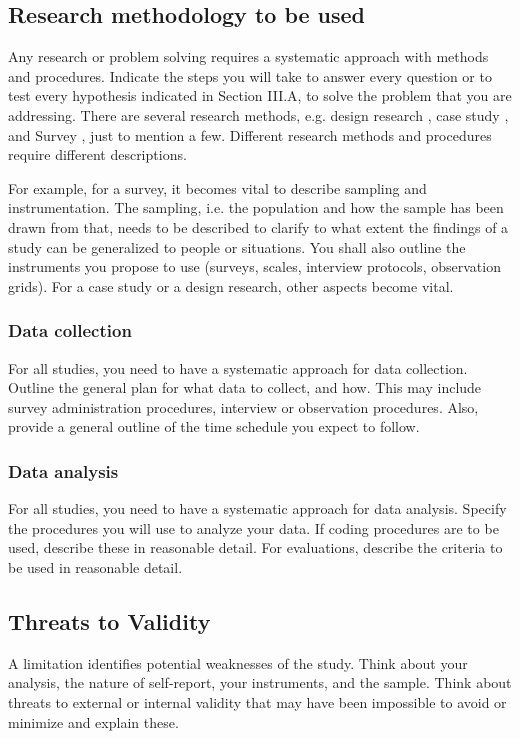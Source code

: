 \documentclass[conference]{IEEEtran}
\begin{document}
\subsection{Research methodology to be used}
Any research or problem solving requires a systematic approach with methods and procedures. Indicate the steps you will take to answer every question or to test every hypothesis indicated in Section III.A, to solve the problem that you are addressing. There are several research methods, e.g. design research \cite{b3}, case study \cite{b5}, and Survey \cite{b2, b4}, just to mention a few. Different research methods and procedures require different descriptions.

For example, for a survey, it becomes vital to describe sampling and instrumentation. The sampling, i.e. the population and how the sample has been drawn from that, needs to be described to clarify to what extent the findings of a study can be generalized to people or situations. You shall also outline the instruments you propose to use (surveys, scales, interview protocols, observation grids). For a case study or a design research, other aspects become vital.

\subsubsection{Data collection}
For all studies, you need to have a systematic approach for data collection. Outline the general plan for what data to collect, and how. This may include survey administration procedures, interview or observation procedures. Also, provide a general outline of the time schedule you expect to follow.

\subsubsection{Data analysis}
For all studies, you need to have a systematic approach for data analysis. Specify the procedures you will use to analyze your data. If coding procedures are to be used, describe these in reasonable detail. For evaluations, describe the criteria to be used in reasonable detail.

\subsection{Threats to Validity}
A limitation identifies potential weaknesses of the study. Think about your analysis, the nature of self-report, your instruments, and the sample. Think about threats to external or internal validity that may have been impossible to avoid or minimize and explain these.
\end{document}
